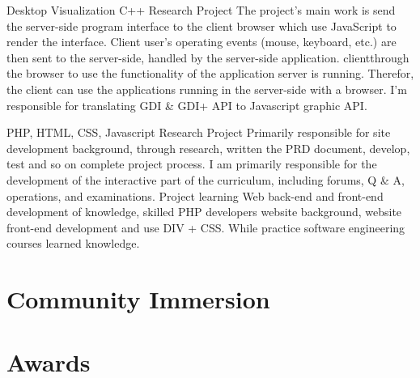 \documentclass[11pt,a4paper]{moderncv}
\begin{document}
\vspace*{0.2\baselineskip}
{Desktop Visualization}
{C++}
{Research Project}{}
{The project's main work is send the server-side program interface to the client browser which use JavaScript to render the interface. 
Client user's operating events (mouse, keyboard, etc.) are then sent to the server-side, handled by the server-side application.
clientthrough the browser to use the functionality of the application server is running. Therefor, the client can use the
applications running in the server-side with a browser. I'm responsible for translating GDI & GDI+ API to Javascript graphic API.
}

\vspace*{0.2\baselineskip}
{}
{PHP, HTML, CSS, Javascript}
{Research Project}{}
{
Primarily responsible for site development background, through research, written the PRD document, develop, test and so on complete project process. I am primarily responsible for the development of the interactive part of the curriculum, including forums, Q & A, operations, and examinations. Project learning Web back-end and front-end development of knowledge, skilled PHP developers website background, website front-end development and use DIV + CSS. While practice software engineering courses learned knowledge.
}







\section{Community Immersion}
\cventry{}{}{}{}{}{}
\cventry{}{}{}{}{}{}
\cventry{}{}{}{}{}{}


\section{Awards}
\end{document}
